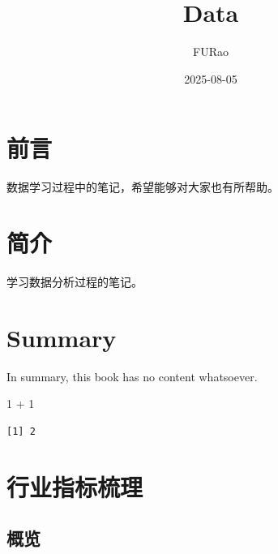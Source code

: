 \documentclass[
  letterpaper,
  DIV=11,
  numbers=noendperiod]{scrreprt}
\title{Data}
\author{FURao}
\date{2025-08-05}
\newenvironment{Shaded}{\begin{snugshade}}{\end{snugshade}}
\newcommand{\DecValTok}[1]{\textcolor[rgb]{0.68,0.00,0.00}{#1}}
\newcommand{\SpecialCharTok}[1]{\textcolor[rgb]{0.37,0.37,0.37}{#1}}
\renewcommand*\contentsname{Table of contents}
\newcommand\contentsname{Table of contents}
\begin{document}
\maketitle

\renewcommand*\contentsname{Table of contents}
{
\hypersetup{linkcolor=}
\setcounter{tocdepth}{2}
\tableofcontents
}


\chapter*{前言}\label{ux524dux8a00}


数据学习过程中的笔记，希望能够对大家也有所帮助。


\chapter{简介}\label{ux7b80ux4ecb}

学习数据分析过程的笔记。


\chapter{Summary}\label{summary}

In summary, this book has no content whatsoever.

\begin{Shaded}
\begin{Highlighting}[]
\DecValTok{1} \SpecialCharTok{+} \DecValTok{1}
\end{Highlighting}
\end{Shaded}

\begin{verbatim}
[1] 2
\end{verbatim}


\chapter{行业指标梳理}\label{ux884cux4e1aux6307ux6807ux68b3ux7406}

\section{概览}\label{ux6982ux89c8}
\end{document}
